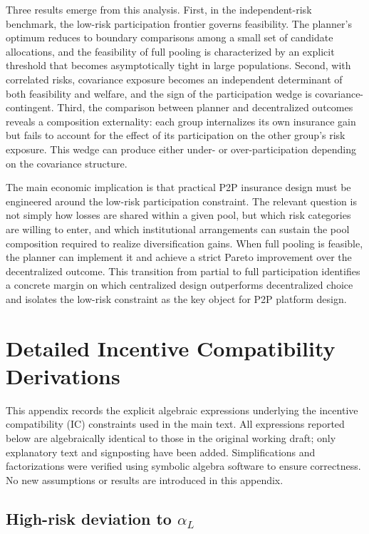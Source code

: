 \documentclass[a4paper,12pt]{article}
\theoremstyle{definition}
\theoremstyle{remark}
\newcommand{\1}{\mathbf{1}}
\begin{document}
Three results emerge from this analysis. First, in the independent-risk benchmark, the low-risk participation frontier governs feasibility. The planner's optimum reduces to boundary comparisons among a small set of candidate allocations, and the feasibility of full pooling is characterized by an explicit threshold that becomes asymptotically tight in large populations. Second, with correlated risks, covariance exposure becomes an independent determinant of both feasibility and welfare, and the sign of the participation wedge is covariance-contingent. Third, the comparison between planner and decentralized outcomes reveals a composition externality: each group internalizes its own insurance gain but fails to account for the effect of its participation on the other group's risk exposure. This wedge can produce either under- or over-participation depending on the covariance structure.

The main economic implication is that practical P2P insurance design must be engineered around the low-risk participation constraint. The relevant question is not simply how losses are shared within a given pool, but which risk categories are willing to enter, and which institutional arrangements can sustain the pool composition required to realize diversification gains. When full pooling is feasible, the planner can implement it and achieve a strict Pareto improvement over the decentralized outcome. This transition from partial to full participation identifies a concrete margin on which centralized design outperforms decentralized choice and isolates the low-risk constraint as the key object for P2P platform design.


\appendix
{}

\section{Detailed Incentive Compatibility Derivations}\label{app:IC}

This appendix records the explicit algebraic expressions underlying the
incentive compatibility (IC) constraints used in the main text. All expressions
reported below are algebraically identical to those in the original working
draft; only explanatory text and signposting have been added. Simplifications
and factorizations were verified using symbolic algebra software to ensure
correctness. No new assumptions or results are introduced in this appendix.

\subsection{High-risk deviation to $\alpha_L$}\label{app:IC-H}
\end{document}

